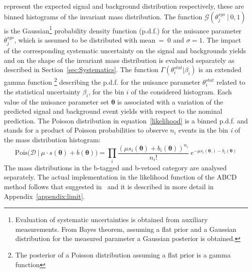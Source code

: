 represent the expected signal and background distribution respectively, these are binned histograms
of the invariant \mmc mass distribution.
The function $\mathcal{G}(\theta_j^{sys} ~ | ~ 0, 1)$
is the  Gaussian\footnote{Evaluation of systematic uncertainties is obtained from auxiliary measurements. From Bayes theorem,
	assuming a flat prior and a Gaussian distribution for the measured parameter a Gaussian posterior is obtained.	
}
probability density function (p.d.f.) for the nuisance parameter $\theta_j^{sys}$, 
which is assumed to be distributed with mean~=~0 and $\sigma = 1$.  The impact of the corresponding systematic uncertainty
on the  signal and backgrounds yields and on the shape of the \mmc invariant mass distribution
 is evaluated separately as described in Section~\ref{sec:Systematics}.
The function  $\Gamma(\theta^{stat}_i | \beta_i)$ is an extended gamma function
\footnote{The posterior of a
	Poisson distribution assuming a flat prior is a gamma function}
describing the p.d.f. for the nuisance parameter $\theta^{stat}_i$ related 
to the statistical uncertainty $ \beta_i$, for the bin $i$ of the considered histogram.
Each value of the nuisance parameter set $\boldsymbol{\theta}$ is associated with a variation of the predicted
signal and background event yields with respect to the nominal prediction.
The Poisson distribution in equation~\eqref{likelihood} is a binned p.d.f. and 
stands for a product of Poisson probabilities to observe $n_i$ events in the bin \textit{i} of the \mmc mass distribution histogram:
$$
 \text{Pois(}\mathcal{D} ~ | ~ \mu \cdot s(\boldsymbol{\theta}) + b(\boldsymbol{\theta})) = \prod_{i} \frac{(\mu s_i(\boldsymbol{\theta}) +b_i(\boldsymbol{\theta}))^{n_i}}{n_i!} ~ e^{-\mu s_i(\boldsymbol{\theta}.)
 -b_i(\boldsymbol{\theta})}
$$
The \mmc mass distributions in the b-tagged and b-vetoed category are analysed separately.
The actual implementation in the likelihood function of the ABCD method follows that suggested in~\cite{ABCD}
and it is described in more detail in Appendix~\ref{appendix:limit}.


